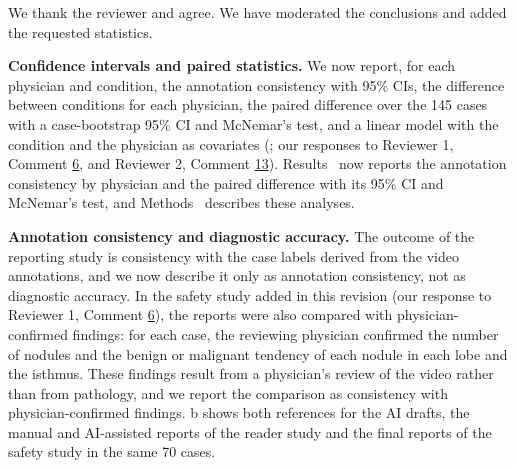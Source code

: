 We thank the reviewer and agree. We have moderated the conclusions and added the requested statistics.\par

\textbf{Confidence intervals and paired statistics.} We now report, for each physician and condition, the annotation consistency with 95\% CIs, the difference between conditions for each physician, the paired difference over the 145 cases with a case-bootstrap 95\% CI and McNemar's test, and a linear model with the condition and the physician as covariates (; our responses to Reviewer 1, Comment \hyperref[rev:R1.6]{6}, and Reviewer 2, Comment \hyperref[rev:R2.13]{13}). Results~\SecResReport{} now reports the annotation consistency by physician and the paired difference with its 95\% CI and McNemar's test, and Methods~\SecMethReader{} describes these analyses.\par

\textbf{Annotation consistency and diagnostic accuracy.} The outcome of the reporting study is consistency with the case labels derived from the video annotations, and we now describe it only as annotation consistency, not as diagnostic accuracy. In the safety study added in this revision (our response to Reviewer 1, Comment \hyperref[rev:R1.6]{6}), the reports were also compared with physician-confirmed findings: for each case, the reviewing physician confirmed the number of nodules and the benign or malignant tendency of each nodule in each lobe and the isthmus. These findings result from a physician's review of the video rather than from pathology, and we report the comparison as consistency with physician-confirmed findings. b shows both references for the AI drafts, the manual and AI-assisted reports of the reader study and the final reports of the safety study in the same 70 cases.\par
